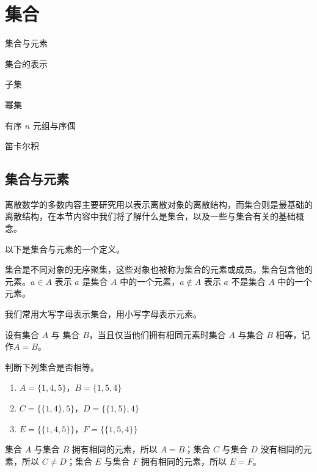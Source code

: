 \section{集合}
\begin{introduction}
    \item 集合与元素
    \item 集合的表示
    \item 子集
    \item 幂集
    \item 有序 $n$ 元组与序偶
    \item 笛卡尔积
\end{introduction}

\subsection{集合与元素}
离散数学的多数内容主要研究用以表示离散对象的离散结构，而集合则是最基础的离散结构，在本节内容中我们将了解什么是集合，以及一些与集合有关的基础概念。

以下是集合与元素的一个定义。
\begin{definition}[集合与元素]\label{def:集合与元素}
    集合是不同对象的无序聚集，这些对象也被称为集合的元素或成员。集合包含他的元素。$a \in A$ 表示 $a$ 是集合 $A$ 中的一个元素，$a \notin A$ 表示 $a$ 不是集合 $A$ 中的一个元素。
\end{definition}

我们常用大写字母表示集合，用小写字母表示元素。
\begin{definition}[相等的集合]\label{def:相等的集合}
    设有集合 $A$ 与 集合 $B$，当且仅当他们拥有相同元素时集合 $A$ 与集合 $B$ 相等，记作$A = B$。
\end{definition}

\begin{collections}
    \begin{example}
        判断下列集合是否相等。
        \begin{enumerate}
            \item $A = \{ 1, 4, 5 \}$，$B = \{ 1, 5 ,4 \}$
            \item $C = \{ \{ 1, 4 \}, 5 \}$，$D = \{ \{ 1, 5 \}, 4 \}$
            \item $E = \{ \{ 1, 4, 5 \} \}$，$F = \{ \{ 1, 5, 4 \} \}$
        \end{enumerate}
    \end{example}
    \begin{solution}
        集合 $A$ 与集合 $B$ 拥有相同的元素，所以 $A = B$；集合 $C$ 与集合 $D$ 没有相同的元素，所以 $C \neq D$；集合 $E$ 与集合 $F$ 拥有相同的元素，所以 $E = F$。
    \end{solution}
\end{collections}

